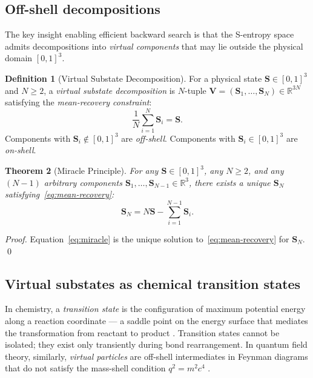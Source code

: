 \documentclass[twocolumn,10pt,a4paper]{article}
\theoremstyle{thmstyle}
\newtheorem{theorem}{Theorem}[section]
\theoremstyle{definition}
\newtheorem{definition}[theorem]{Definition}
\theoremstyle{remark}
\newcommand{\R}{\mathbb{R}}
\newcommand{\Sv}{\mathbf{S}}
\begin{document}
\subsection{Off-shell decompositions}

The key insight enabling efficient backward search is that the S-entropy
space admits decompositions into \emph{virtual components} that may lie
outside the physical domain $[0,1]^3$.

\begin{definition}[Virtual Substate Decomposition]
\label{def:virtual}
For a physical state $\Sv \in [0,1]^3$ and $N \geq 2$, a
\emph{virtual substate decomposition} is $N$-tuple
$\mathbf{V} = (\Sv_1, \ldots, \Sv_N) \in \R^{3N}$ satisfying the
\emph{mean-recovery constraint}:
\begin{equation}
\frac{1}{N}\sum_{i=1}^{N}\Sv_i = \Sv.
\label{eq:mean-recovery}
\end{equation}
Components with $\Sv_i \notin [0,1]^3$ are \emph{off-shell}.
Components with $\Sv_i \in [0,1]^3$ are \emph{on-shell}.
\end{definition}

\begin{theorem}[Miracle Principle]
\label{thm:miracle}
For any $\Sv \in [0,1]^3$, any $N \geq 2$, and any $(N-1)$ arbitrary
components $\Sv_1, \ldots, \Sv_{N-1} \in \R^3$, there exists a unique
$\Sv_N$ satisfying~\eqref{eq:mean-recovery}:
\begin{equation}
\Sv_N = N\Sv - \sum_{i=1}^{N-1}\Sv_i.
\label{eq:miracle}
\end{equation}
\end{theorem}

\begin{proof}
Equation~\eqref{eq:miracle} is the unique solution to~\eqref{eq:mean-recovery}
for $\Sv_N$. \qed
\end{proof}

\subsection{Virtual substates as chemical transition states}

In chemistry, a \emph{transition state} is the configuration of maximum
potential energy along a reaction coordinate --- a saddle point on the
energy surface that mediates the transformation from reactant to product
\citep{peskin1995}. Transition states cannot be isolated; they exist only
transiently during bond rearrangement. In quantum field theory, similarly,
\emph{virtual particles} are off-shell intermediates in Feynman diagrams
that do not satisfy the mass-shell condition $q^2 = m^2c^4$
\citep{peskin1995}.
\end{document}
